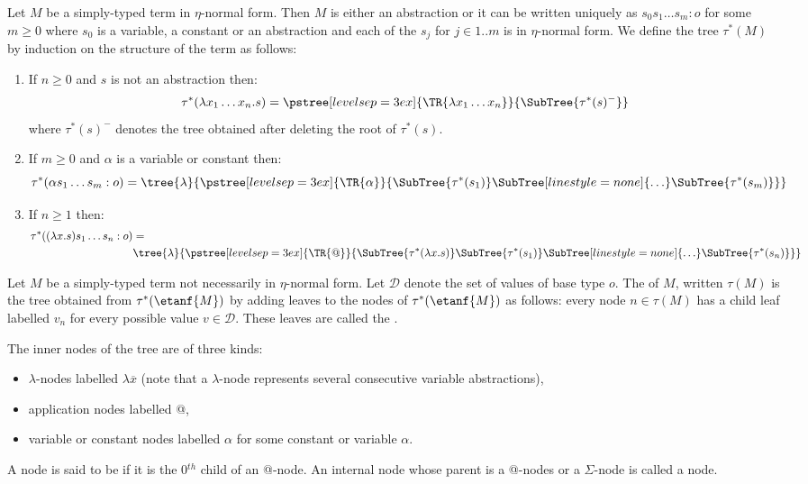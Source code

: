 \begin{definition}
\label{dfn:comptree} Let $M$ be a simply-typed term in $\eta$-normal
form. Then $M$ is either an abstraction or it can be written
uniquely as $s_0 s_1 \ldots s_m : o$ for some $m\geq0$ where $s_0$
is a variable, a constant or an abstraction and each of the $s_j$
for $j\in 1..m$ is in $\eta$-normal form. We define the
tree $\tau^*(M)$ by induction on the structure of the term as follows:
\begin{enumerate}[-]
\item If $n\geq0$ and $s$ is not an abstraction then:
$$ \tau^*(\lambda x_1 \ldots x_n . s) =
      \pstree[levelsep=3ex]
        { \TR{\lambda x_1 \ldots x_n} }
        { \SubTree{\tau^*(s)^{-}} }
$$
where $\tau^*(s)^{-}$ denotes the tree obtained after deleting the root of $\tau^*(s)$.

\item If $m\geq0$ and $\alpha$ is a variable or constant then:
$$ \tau^*( \alpha s_1 \ldots s_m : o) =
    \tree{\lambda}
    {
        \pstree[levelsep=3ex]
            { \TR{\alpha} }
            { \SubTree{\tau^*(s_1)} \SubTree[linestyle=none]{\ldots} \SubTree{\tau^*(s_m)}
            }
    }
$$

\item If $n \geq 1$ then:
\begin{align*}
 \tau^*((\lambda x.s) s_1 \ldots s_n : o) &=\\
   & \tree{\lambda}
    {
        \pstree[levelsep=3ex]
            { \TR{@} }
            {
            \SubTree{\tau^*(\lambda x.s)} \SubTree{\tau^*(s_1)} \SubTree[linestyle=none]{\ldots} \SubTree{\tau^*(s_n)}
            }
    }
\end{align*}
\end{enumerate}

Let $M$ be a simply-typed term not necessarily in $\eta$-normal form. Let $\mathcal{D}$ denote the set of values of base type $o$. The  of $M$, written $\tau(M)$ is the tree obtained from
$\tau^*(\etanf{M})$ by adding leaves to the nodes of $\tau^*(\etanf{M})$ as follows:
every node $n \in \tau(M)$ has a child leaf labelled $v_n$ for every possible value $v \in \mathcal{D}$.
These leaves are called the .
\end{definition}

The inner nodes of the tree are of three kinds:
\begin{itemize}
\item $\lambda$-nodes labelled $\lambda \overline{x}$ (note that a $\lambda$-node represents several consecutive variable abstractions),
\item application nodes labelled @,
\item variable or constant nodes labelled $\alpha$ for some constant or variable $\alpha$.
\end{itemize}
A node is said to be  if it is the 0$^{th}$ child of an @-node.
An internal node whose parent is a @-nodes or a $\Sigma$-node is called a  node.
\bigskip

